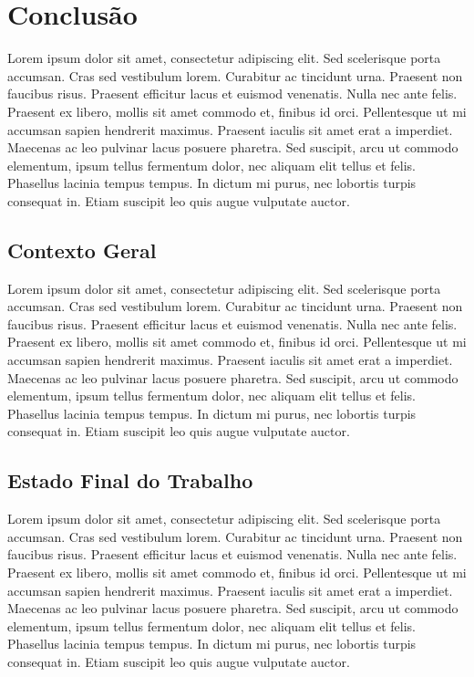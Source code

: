 \chapter{Conclusão}
\label{cap-status-atual}

Lorem ipsum dolor sit amet, consectetur adipiscing elit. Sed scelerisque porta accumsan. Cras sed vestibulum lorem. Curabitur ac tincidunt urna. Praesent non faucibus risus. Praesent efficitur lacus et euismod venenatis. Nulla nec ante felis. Praesent ex libero, mollis sit amet commodo et, finibus id orci. Pellentesque ut mi accumsan sapien hendrerit maximus. Praesent iaculis sit amet erat a imperdiet. Maecenas ac leo pulvinar lacus posuere pharetra. Sed suscipit, arcu ut commodo elementum, ipsum tellus fermentum dolor, nec aliquam elit tellus et felis. Phasellus lacinia tempus tempus. In dictum mi purus, nec lobortis turpis consequat in. Etiam suscipit leo quis augue vulputate auctor.

\section{Contexto Geral}
\label{contexto-geral}

Lorem ipsum dolor sit amet, consectetur adipiscing elit. Sed scelerisque porta accumsan. Cras sed vestibulum lorem. Curabitur ac tincidunt urna. Praesent non faucibus risus. Praesent efficitur lacus et euismod venenatis. Nulla nec ante felis. Praesent ex libero, mollis sit amet commodo et, finibus id orci. Pellentesque ut mi accumsan sapien hendrerit maximus. Praesent iaculis sit amet erat a imperdiet. Maecenas ac leo pulvinar lacus posuere pharetra. Sed suscipit, arcu ut commodo elementum, ipsum tellus fermentum dolor, nec aliquam elit tellus et felis. Phasellus lacinia tempus tempus. In dictum mi purus, nec lobortis turpis consequat in. Etiam suscipit leo quis augue vulputate auctor.

\section{Estado Final do Trabalho}
\label{status-final}

Lorem ipsum dolor sit amet, consectetur adipiscing elit. Sed scelerisque porta accumsan. Cras sed vestibulum lorem. Curabitur ac tincidunt urna. Praesent non faucibus risus. Praesent efficitur lacus et euismod venenatis. Nulla nec ante felis. Praesent ex libero, mollis sit amet commodo et, finibus id orci. Pellentesque ut mi accumsan sapien hendrerit maximus. Praesent iaculis sit amet erat a imperdiet. Maecenas ac leo pulvinar lacus posuere pharetra. Sed suscipit, arcu ut commodo elementum, ipsum tellus fermentum dolor, nec aliquam elit tellus et felis. Phasellus lacinia tempus tempus. In dictum mi purus, nec lobortis turpis consequat in. Etiam suscipit leo quis augue vulputate auctor.

